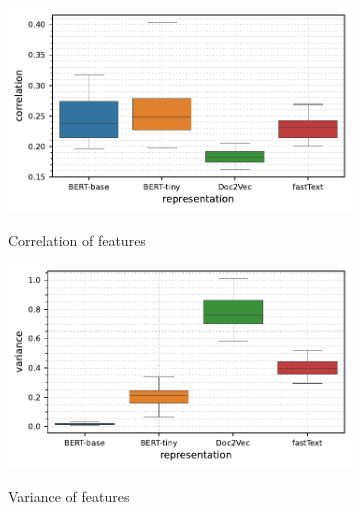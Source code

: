 \begin{figure}[t]
    \centering
    \begin{subfigure}[b]{0.495\textwidth}
        \centering
        \caption{\small Correlation of features}
        \includegraphics[width=\textwidth]{images/real-characteristics/text-banking77/properties-banking77-abscorr(representation,representation)-representation_BERT-base,BERT-tiny,Doc2Vec,fastText-class_0,61-data_ID-train.pdf}
        \label{fig:text-banking77-abscorr}
    \end{subfigure}
    \hfill
    \begin{subfigure}[b]{0.495\textwidth}
        \centering
        \caption{\small Variance of features}
        \includegraphics[width=\textwidth]{images/real-characteristics/text-banking77/properties-banking77-var(representation,representation)-representation_BERT-base,BERT-tiny,Doc2Vec,fastText-class_0,61-data_ID-train.pdf}
        \label{fig:text-banking77-var}
    \end{subfigure}
    \begin{subfigure}[b]{0.495\textwidth}

\end{subfigure}
\end{figure}
